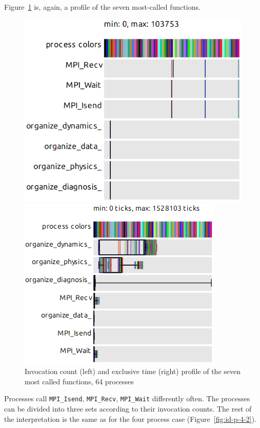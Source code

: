 \documentclass[b5paper, final, hauptseminar]{zih-template}
\begin{document}
Figure~\ref{fig:id-p-64-2} is, again, a profile of the seven most-called functions.
\begin{figure}[htbp]
	\centering
	\begin{minipage}{0.20\linewidth}
	\end{minipage}
	\begin{minipage}{0.39\linewidth}
		\includegraphics[width=0.9\linewidth]{id-p-64-2}
	\end{minipage}
	\begin{minipage}{0.39\linewidth}
		\includegraphics[width=0.9\linewidth]{id-p-64-3}
	\end{minipage}
	\caption{Invocation count (left) and exclusive time (right) profile of the seven most called functions, 64 processes}
	\label{fig:id-p-64-2}
\end{figure}
Processes call \texttt{MPI\_Isend}, \texttt{MPI\_Recv}, \texttt{MPI\_Wait} differently often.
The processes can be divided into three sets according to their invocation counts.
The rest of the interpretation is the same as for the four process case (Figure~\ref{fig:id-p-4-2}).
\end{document}
